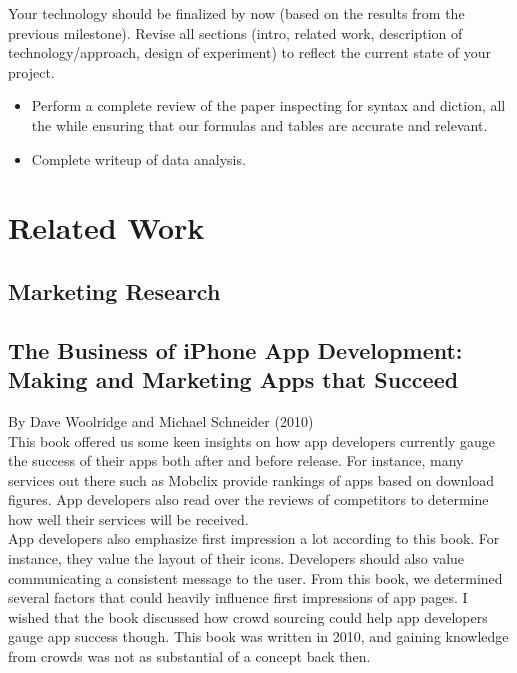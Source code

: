 \documentclass{article}
\begin{document}
Your technology should be finalized by now (based on the results from the previous milestone). Revise all sections (intro, related work, description of technology/approach, design of experiment) to reflect the current state of your project. \\

\begin{itemize}
\item Perform a complete review of the paper inspecting for syntax and diction, all the while ensuring that our formulas and tables are accurate and relevant.
\item Complete writeup of data analysis.
\end{itemize}

\section{Related Work}



\subsection{Marketing Research}

\subsection{The Business of iPhone App Development: Making and Marketing Apps that Succeed}

By Dave Woolridge and Michael Schneider (2010) \\

This book offered us some keen insights on how app developers currently gauge the success of their apps both after and before release. For instance, many services out there such as Mobclix provide rankings of apps based on download figures. App developers also read over the reviews of competitors to determine how well their services will be received. \\

App developers also emphasize first impression a lot according to this book. For instance, they value the layout of their icons. Developers should also value communicating a consistent message to the user. From this book, we determined several factors that could heavily influence first impressions of app pages. I wished that the book discussed how crowd sourcing could help app developers gauge app success though. This book was written in 2010, and gaining knowledge from crowds was not as substantial of a concept back then.
\end{document}
